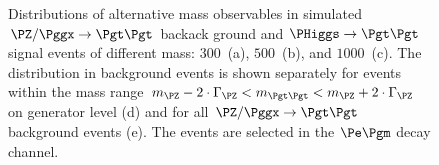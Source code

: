 {{{{{\begin{figure}
\begin{center}
\end{center}
\caption{
  Distributions of alternative mass observables in simulated $\PZ/\Pggx \to \Pgt\Pgt$ backack ground
  and $\PHiggs \to \Pgt\Pgt$ signal events of different mass:
  $300$~\GeV (a), $500$~\GeV (b), and $1000$~\GeV (c).
  The distribution in background events is shown separately for events within the
  mass range $m_{\PZ} - 2 \cdot \Gamma_{\PZ} < m_{\Pgt\Pgt} < m_{\PZ} + 2 \cdot \Gamma_{\PZ}$ on generator level (d)
  and for all $\PZ/\Pggx \to \Pgt\Pgt$ background events (e).
  The events are selected in the $\Pe\Pgm$ decay channel.
}
\label{fig:massDistributions_mssm_emu}
\end{figure}




}}}}}
